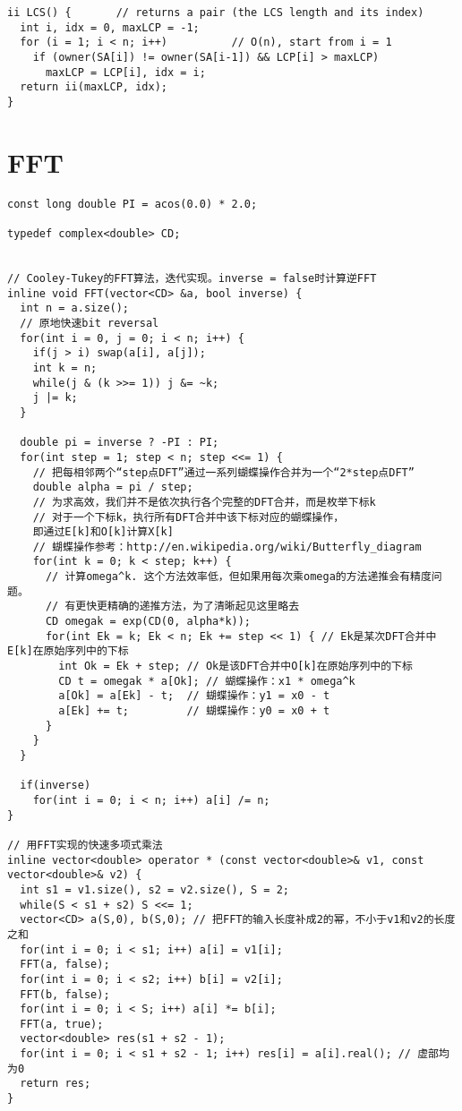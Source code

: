 \documentclass[10pt,landscape]{article}
\begin{document}
\begin{multicols}{2}
\begin{lstlisting}
ii LCS() {       // returns a pair (the LCS length and its index)
  int i, idx = 0, maxLCP = -1;
  for (i = 1; i < n; i++)          // O(n), start from i = 1
    if (owner(SA[i]) != owner(SA[i-1]) && LCP[i] > maxLCP)
      maxLCP = LCP[i], idx = i;
  return ii(maxLCP, idx);
}
\end{lstlisting}

\section{FFT}
\begin{lstlisting}
const long double PI = acos(0.0) * 2.0;

typedef complex<double> CD;


// Cooley-Tukey的FFT算法，迭代实现。inverse = false时计算逆FFT
inline void FFT(vector<CD> &a, bool inverse) {
  int n = a.size();
  // 原地快速bit reversal
  for(int i = 0, j = 0; i < n; i++) {
    if(j > i) swap(a[i], a[j]);
    int k = n;
    while(j & (k >>= 1)) j &= ~k;
    j |= k;
  }

  double pi = inverse ? -PI : PI;
  for(int step = 1; step < n; step <<= 1) {
    // 把每相邻两个“step点DFT”通过一系列蝴蝶操作合并为一个“2*step点DFT”
    double alpha = pi / step;
    // 为求高效，我们并不是依次执行各个完整的DFT合并，而是枚举下标k
    // 对于一个下标k，执行所有DFT合并中该下标对应的蝴蝶操作，
    即通过E[k]和O[k]计算X[k]
    // 蝴蝶操作参考：http://en.wikipedia.org/wiki/Butterfly_diagram
    for(int k = 0; k < step; k++) {
      // 计算omega^k. 这个方法效率低，但如果用每次乘omega的方法递推会有精度问题。
      // 有更快更精确的递推方法，为了清晰起见这里略去
      CD omegak = exp(CD(0, alpha*k)); 
      for(int Ek = k; Ek < n; Ek += step << 1) { // Ek是某次DFT合并中E[k]在原始序列中的下标
        int Ok = Ek + step; // Ok是该DFT合并中O[k]在原始序列中的下标
        CD t = omegak * a[Ok]; // 蝴蝶操作：x1 * omega^k
        a[Ok] = a[Ek] - t;  // 蝴蝶操作：y1 = x0 - t
        a[Ek] += t;         // 蝴蝶操作：y0 = x0 + t
      }
    }
  }

  if(inverse)
    for(int i = 0; i < n; i++) a[i] /= n;
}

// 用FFT实现的快速多项式乘法
inline vector<double> operator * (const vector<double>& v1, const vector<double>& v2) {
  int s1 = v1.size(), s2 = v2.size(), S = 2;
  while(S < s1 + s2) S <<= 1;
  vector<CD> a(S,0), b(S,0); // 把FFT的输入长度补成2的幂，不小于v1和v2的长度之和
  for(int i = 0; i < s1; i++) a[i] = v1[i];
  FFT(a, false);
  for(int i = 0; i < s2; i++) b[i] = v2[i];
  FFT(b, false);
  for(int i = 0; i < S; i++) a[i] *= b[i];
  FFT(a, true);
  vector<double> res(s1 + s2 - 1);
  for(int i = 0; i < s1 + s2 - 1; i++) res[i] = a[i].real(); // 虚部均为0
  return res;
}
\end{lstlisting}
\end{multicols}
\end{document}
